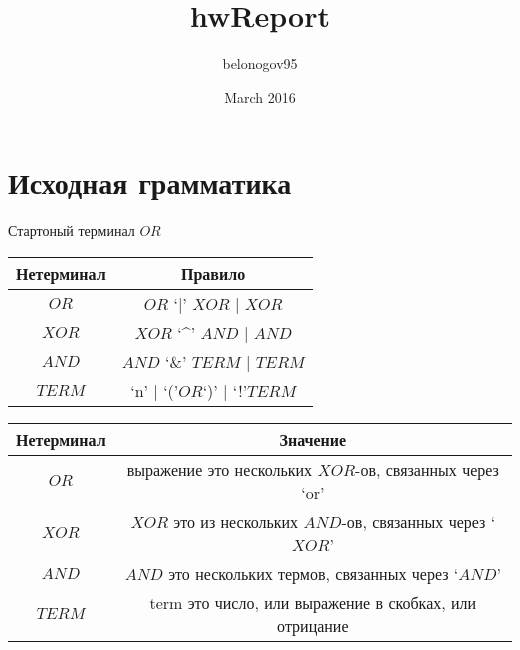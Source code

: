 \documentclass{article}
\title{hwReport}
\author{belonogov95 }
\date{March 2016}
\begin{document}




\section{Исходная грамматика}


Стартоный терминал $OR$
\begin{center}
\begin{tabular}{ | c | c | }
    \hline
     Нетерминал & Правило  \\ \hline
    $OR$ & $OR$ `|' $XOR$ | $XOR$  \\ \hline
    $XOR$ & $XOR$ `\textasciicircum'  $AND$  | $AND$ \\ \hline

    $AND$ & $AND$ `\&' $TERM$  | $TERM$ \\ \hline

    $TERM$ & `n'  | `('$OR$`)' | `!'$TERM$ \\ \hline

\end{tabular}
\end{center}



\begin{center}
\begin{tabular}{ | c | c | }
    \hline
     Нетерминал &  Значение \\ \hline
    $OR$  &  выражение это нескольких $XOR$-ов, связанных через `or' \\ \hline
    $XOR$ & $XOR$ это из нескольких $AND$-ов, связанных через `$XOR$' \\ \hline

    $AND$ & $AND$ это нескольких термов, связанных через `$AND$'\\ \hline

    $TERM$ & term это число, или выражение в скобках, или отрицание \\ \hline

\end{tabular}
\end{center}
\end{document}
